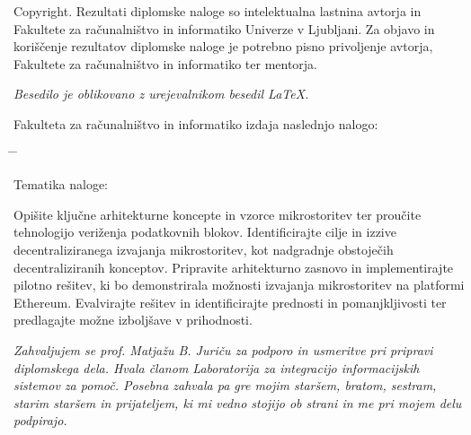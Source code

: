 \documentclass[a4paper, 12pt]{book}
\newcommand{\clearemptydoublepage}{\newpage{\pagestyle{empty}\cleardoublepage}}
\begin{document}
\noindent
{\sc Copyright}. 
Rezultati diplomske naloge so intelektualna lastnina avtorja in Fakultete za računalništvo in informatiko Univerze v Ljubljani.
Za objavo in koriščenje rezultatov diplomske naloge je potrebno pisno privoljenje avtorja, Fakultete za računalništvo in informatiko ter mentorja.

\begin{center}
\mbox{}\vfill
\emph{Besedilo je oblikovano z urejevalnikom besedil \LaTeX.}
\end{center}
\clearemptydoublepage

\thispagestyle{empty}
\vspace*{4cm}

\noindent
Fakulteta za računalništvo in informatiko izdaja naslednjo nalogo:
\medskip
\begin{tabbing}
\hspace{32mm}\= \hspace{6cm} \= \kill




Tematika naloge:
\end{tabbing}
Opišite ključne arhitekturne koncepte in vzorce mikrostoritev ter proučite tehnologijo veriženja podatkovnih blokov. Identificirajte cilje in izzive decentraliziranega izvajanja mikrostoritev, kot nadgradnje obstoječih decentraliziranih konceptov. Pripravite arhitekturno zasnovo in implementirajte pilotno rešitev, ki bo demonstrirala možnosti izvajanja mikrostoritev na platformi Ethereum. Evalvirajte rešitev in identificirajte prednosti in pomanjkljivosti ter predlagajte možne izboljšave v prihodnosti. 
\vspace{15mm}



\vspace{2cm}

\clearemptydoublepage

\thispagestyle{empty}\mbox{}\vfill\null\it%
\noindent
Zahvaljujem se prof. Matjažu B. Juriču za podporo in usmeritve pri pripravi diplomskega dela. Hvala članom Laboratorija za integracijo informacijskih sistemov za pomoč. Posebna zahvala pa gre mojim staršem, bratom, sestram, starim staršem in prijateljem, ki mi vedno stojijo ob strani in me pri mojem delu podpirajo.
\rm\normalfont

\clearemptydoublepage

\end{document}
